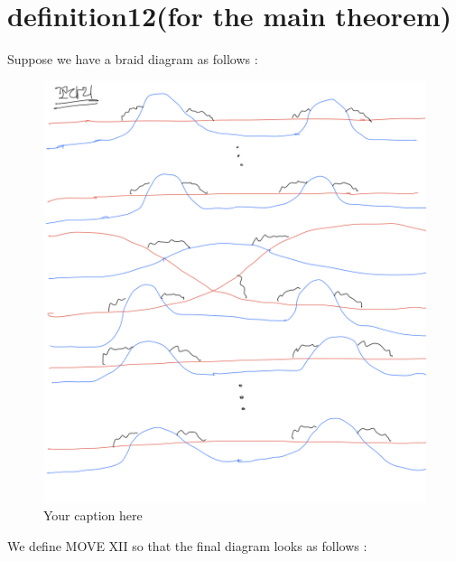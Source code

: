 \section{definition12(for the main theorem)}
\begin{definition}
\end{definition}

Suppose we have a braid diagram as follows :

\begin{figure}[H] %
    \centering
    \includegraphics[width=\linewidth]{diagrams/definition12/1.png} %
    \caption{Your caption here}
    \label{fig:your-label}
\end{figure}

We define MOVE \RN{12} so that the final diagram looks as follows :

